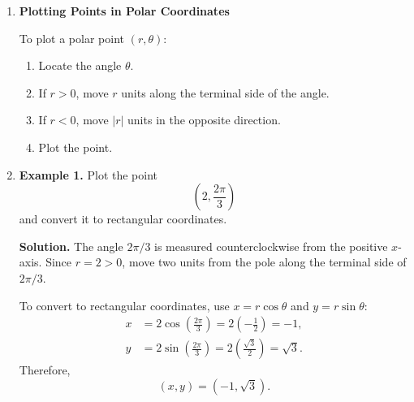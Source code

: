 \documentclass[11pt,letterpaper]{article}
\newenvironment{notebox}{%
  \begin{center}%
  \begin{minipage}{0.94\textwidth}%
  \hrule\smallskip
}{%
  \smallskip\hrule
  \end{minipage}%
  \end{center}%
}
\begin{document}
\begin{enumerate}
\begin{enumerate}
The conversion formulas follow from right-triangle trigonometry:
\[
\boxed{x=r\cos\theta}
\qquad\text{and}\qquad
\boxed{y=r\sin\theta}.
\]
Also,
\[
\boxed{r^2=x^2+y^2}.
\]
When converting from rectangular to polar coordinates, the equation
\[
\tan\theta=\frac{y}{x}
\]
may help determine an angle, but the quadrant of $(x,y)$ must also be considered.

\item \textbf{Polar representations are not unique.}

Adding a complete revolution does not change the point:
\[
(r,\theta)=(r,\theta+2\pi k),\qquad k\in\mathbb Z.
\]
A negative radius reverses the direction by $\pi$ radians:
\[
(r,\theta)=(-r,\theta+\pi).
\]
For example,
\[
\left(2,\frac{\pi}{3}\right)
=\left(2,\frac{7\pi}{3}\right)
=\left(-2,\frac{4\pi}{3}\right).
\]
All three ordered pairs represent the same point.
\end{enumerate}

\begin{notebox}
\textbf{Important:} A polar ordered pair is written $(r,\theta)$. First determine the angle $\theta$; then use the directed radius $r$ to locate the point.
\end{notebox}

\item \textbf{Plotting Points in Polar Coordinates}

To plot a polar point $(r,\theta)$:
\begin{enumerate}
\item Locate the angle $\theta$.
\item If $r>0$, move $r$ units along the terminal side of the angle.
\item If $r<0$, move $|r|$ units in the opposite direction.
\item Plot the point.
\end{enumerate}

\item \textbf{Example 1.} Plot the point
\[
\left(2,\frac{2\pi}{3}\right)
\]
and convert it to rectangular coordinates.

\textbf{Solution.} The angle $2\pi/3$ is measured counterclockwise from the positive $x$-axis. Since $r=2>0$, move two units from the pole along the terminal side of $2\pi/3$.

To convert to rectangular coordinates, use $x=r\cos\theta$ and $y=r\sin\theta$:
\begin{align*}
x&=2\cos\left(\frac{2\pi}{3}\right)
  =2\left(-\frac12\right)=-1,\\
y&=2\sin\left(\frac{2\pi}{3}\right)
  =2\left(\frac{\sqrt3}{2}\right)=\sqrt3.
\end{align*}
Therefore,
\[
\boxed{(x,y)=(-1,\sqrt3)}.
\]


\end{enumerate}
\end{document}
